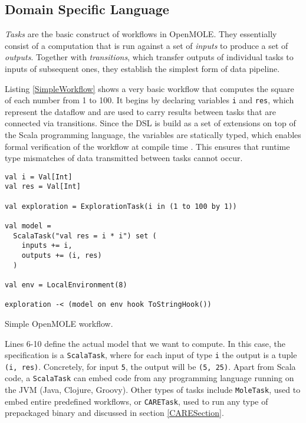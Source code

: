 \subsection{Domain Specific Language}

\textit{Tasks} are the basic construct of workflows in OpenMOLE. They essentially consist of a computation that is run against a set of \textit{inputs} to produce a set of \textit{outputs}. Together with \textit{transitions}, which transfer outputs of individual tasks to inputs of subsequent ones, they establish the simplest form of data pipeline.

Listing \ref{SimpleWorkflow} shows a very basic workflow that computes the square of each number from 1 to 100. It begins by declaring variables \verb|i| and \verb|res|, which represent the dataflow and are used to carry results between tasks that are connected via transitions. Since the DSL is build as a set of extensions on top of the Scala programming language, the variables are statically typed, which enables formal verification of the workflow at compile time \cite{Reuillon2013}. This ensures that runtime type mismatches of data transmitted between tasks cannot occur.

\begin{listing}[h]
	\centering
	\begin{minipage}{10.6cm}
		\begin{verbatim}
val i = Val[Int]
val res = Val[Int]

val exploration = ExplorationTask(i in (1 to 100 by 1))

val model =
  ScalaTask("val res = i * i") set (
    inputs += i,
    outputs += (i, res)
  )

val env = LocalEnvironment(8)

exploration -< (model on env hook ToStringHook())
		\end{verbatim}
	\end{minipage}
	\caption{Simple OpenMOLE workflow.}
	\label{SimpleWorkflow}
\end{listing}

Lines 6-10 define the actual model that we want to compute. In this case, the specification is a \verb|ScalaTask|, where for each input of type \verb|i| the output is a tuple \verb|(i, res)|. Concretely, for input \verb|5|, the output will be \verb|(5, 25)|. Apart from Scala code, a \verb|ScalaTask| can embed code from any programming language running on the JVM (Java, Clojure, Groovy). Other types of tasks include \verb|MoleTask|, used to embed entire predefined workflows, or \verb|CARETask|, used to run any type of prepackaged binary and discussed in section \ref{CARESection}.

